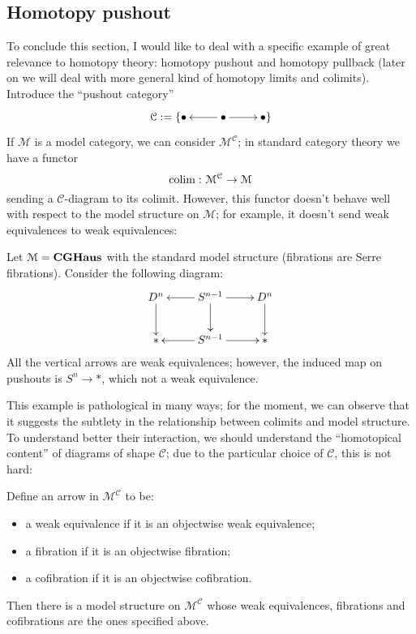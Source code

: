 \begin{refsection}
\subsection{Homotopy pushout} \label{homotopy pushout}

To conclude this section, I would like to deal with a specific example of great relevance to homotopy theory: homotopy pushout and homotopy pullback (later on we will deal with more general kind of homotopy limits and colimits). Introduce the ``pushout category''
\[
\xymatrix{
\mathcal C := \{ \bullet & \bullet \ar[l] \ar[r] & \bullet \}
}
\]
If $\mathcal M$ is a model category, we can consider $\mathcal M^{\mathcal C}$; in standard category theory we have a functor
\[
\mathrm{colim} \, \colon \mathcal M^{\mathcal C} \to \mathcal M
\]
sending a $\mathcal C$-diagram to its colimit. However, this functor doesn't behave well with respect to the model structure on $\mathcal M$; for example, it doesn't send weak equivalences to weak equivalences:

\begin{eg} \label{eg pushout fails in homotopy}
Let $\mathcal M = \mathbf{CGHaus}$ with the standard model structure (fibrations are Serre fibrations). Consider the following diagram:
\[
\xymatrix{
D^n \ar[d] & S^{n-1} \ar[l] \ar[r] \ar[d] & D^n \ar[d] \\ \mathrm{*} & S^{n-1} \ar[r] \ar[l] & \mathrm{*}
}
\]
All the vertical arrows are weak equivalences; however, the induced map on pushouts is $S^n \to *$, which not a weak equivalence.
\end{eg}

This example is pathological in many ways; for the moment, we can observe that it suggests the subtlety in the relationship between colimits and model structure. To understand better their interaction, we should understand the ``homotopical content'' of diagrams of shape $\mathcal C$; due to the particular choice of $\mathcal C$, this is not hard:

\begin{lemma}
Define an arrow in $\mathcal M^{\mathcal C}$ to be:
\begin{itemize}
\item a weak equivalence if it is an objectwise weak equivalence;
\item a fibration if it is an objectwise fibration;
\item a cofibration if it is an objectwise cofibration.
\end{itemize}
Then there is a model structure on $\mathcal M^{\mathcal C}$ whose weak equivalences, fibrations and cofibrations are the ones specified above.
\end{lemma}


\end{refsection}
